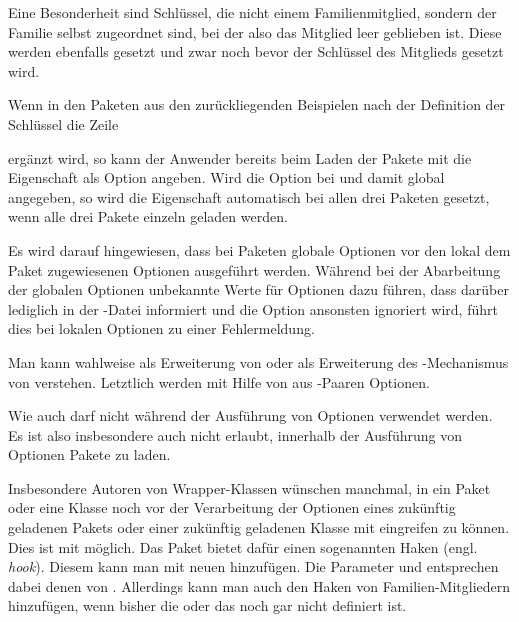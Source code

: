 Eine Besonderheit sind Schlüssel, die nicht einem Familienmitglied, sondern
der Familie selbst zugeordnet sind, bei der also das Mitglied leer geblieben
ist. Diese werden ebenfalls gesetzt und zwar noch bevor der Schlüssel des
Mitglieds gesetzt wird.
\begin{Example}
  Wenn in den Paketen aus den zurückliegenden Beispielen nach der Definition
  der Schlüssel die Zeile
\begin{lstcode}
\end{lstcode}
  ergänzt wird, so kann der Anwender bereits beim Laden der Pakete mit
   die Eigenschaft  als Option
  angeben. Wird die Option bei  und damit global
  angegeben, so wird die Eigenschaft automatisch bei allen drei Paketen
  gesetzt, wenn alle drei Pakete einzeln geladen werden.
\end{Example}
Es wird darauf hingewiesen, dass bei Paketen globale
Optionen vor den lokal dem Paket zugewiesenen Optionen ausgeführt
werden. Während bei der Abarbeitung der globalen Optionen unbekannte Werte für
Optionen dazu führen, dass darüber lediglich in der -Datei
informiert und die Option ansonsten ignoriert wird, führt dies bei lokalen
Optionen zu einer Fehlermeldung.

Man kann  wahlweise als Erweiterung von
 oder als Erweiterung des
-Mechanismus von  verstehen. Letztlich
werden mit Hilfe von  aus
-Paaren Optionen.

Wie auch  darf
 nicht während der Ausführung von Optionen
verwendet werden. Es ist also insbesondere auch nicht erlaubt, innerhalb der
Ausführung von Optionen Pakete zu laden.%
%
\EndIndexGroup


\begin{Declaration}
\end{Declaration}
Insbesondere Autoren von Wrapper-Klassen
wünschen manchmal, in ein Paket oder eine Klasse noch vor der Verarbeitung der
Optionen eines zukünftig geladenen Pakets oder einer zukünftig geladenen
Klasse mit  eingreifen zu
können. Dies ist mit  möglich. Das Paket
 bietet dafür einen sogenannten Haken
(engl. \emph{hook}). Diesem kann man mit 
neuen  hinzufügen. Die Parameter  und
 entsprechen dabei denen von
. Allerdings kann man auch den Haken von
Familien-Mitgliedern  hinzufügen, wenn bisher die 
oder das  noch gar nicht definiert ist.

